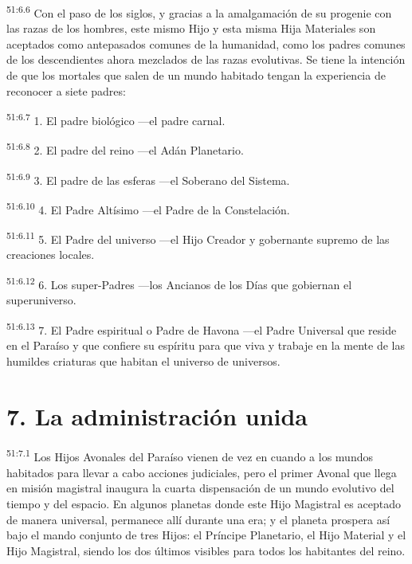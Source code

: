 \par
\textsuperscript{51:6.6} Con el paso de los siglos, y gracias a la amalgamación de su progenie con las razas de los hombres, este mismo Hijo y esta misma Hija Materiales son aceptados como antepasados comunes de la humanidad, como los padres comunes de los descendientes ahora mezclados de las razas evolutivas. Se tiene la intención de que los mortales que salen de un mundo habitado tengan la experiencia de reconocer a siete padres:

\par
\textsuperscript{51:6.7} 1. El padre biológico ---el padre carnal.

\par
\textsuperscript{51:6.8} 2. El padre del reino ---el Adán Planetario.

\par
\textsuperscript{51:6.9} 3. El padre de las esferas ---el Soberano del Sistema.

\par
\textsuperscript{51:6.10} 4. El Padre Altísimo ---el Padre de la Constelación.

\par
\textsuperscript{51:6.11} 5. El Padre del universo ---el Hijo Creador y gobernante supremo de las creaciones locales.

\par
\textsuperscript{51:6.12} 6. Los super-Padres ---los Ancianos de los Días que gobiernan el superuniverso.

\par
\textsuperscript{51:6.13} 7. El Padre espiritual o Padre de Havona ---el Padre Universal que reside en el Paraíso y que confiere su espíritu para que viva y trabaje en la mente de las humildes criaturas que habitan el universo de universos.

\section*{7. La administración unida}
\par
\textsuperscript{51:7.1} Los Hijos Avonales del Paraíso vienen de vez en cuando a los mundos habitados para llevar a cabo acciones judiciales, pero el primer Avonal que llega en misión magistral inaugura la cuarta dispensación de un mundo evolutivo del tiempo y del espacio. En algunos planetas donde este Hijo Magistral es aceptado de manera universal, permanece allí durante una era; y el planeta prospera así bajo el mando conjunto de tres Hijos: el Príncipe Planetario, el Hijo Material y el Hijo Magistral, siendo los dos últimos visibles para todos los habitantes del reino.

